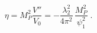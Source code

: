 \begin{equation}
\eta = M_P^2 \frac{V''}{V_0}=
-\frac{\lambda_2^2}{4\pi^2}\,\frac{M_P^2}{\psi_1^2} \;.
\end{equation}

